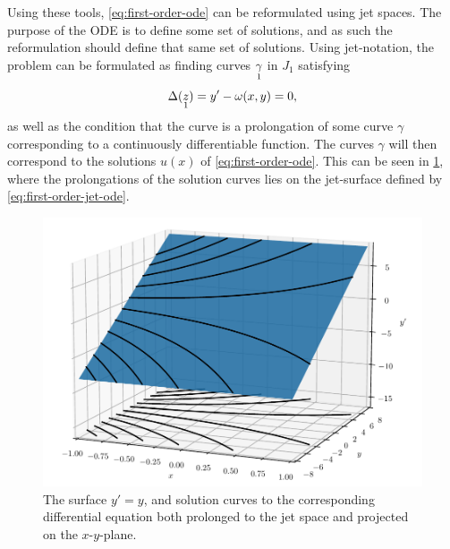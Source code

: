 Using these tools, \cref{eq:first-order-ode} can be reformulated using jet spaces.
The purpose of the ODE is to define some set of solutions, and as such the reformulation should define that same set of solutions.
Using jet-notation, the problem can be formulated as finding curves \(\prolong{\gamma}{1}\) in \(J_1\) satisfying
\begin{equation} \label{eq:first-order-jet-ode}
  \Delta(\prolong{z}{1}) = y' - \omega(x,y) = 0,
\end{equation}
as well as the condition that the curve is a prolongation of some curve \(\gamma\) corresponding to a continuously differentiable function.
The curves \(\gamma\) will then correspond to the solutions \(u(x)\) of \cref{eq:first-order-ode}.
This can be seen in \cref{fig:jet-surface}, where the prolongations of the solution curves lies on the jet-surface defined by \cref{eq:first-order-jet-ode}.
\begin{figure}
  \centering
  \includegraphics[width=.95\textwidth]{images/jet-surface}
  \caption{The surface \(y' = y\), and solution curves to the corresponding differential equation both prolonged to the jet space and projected on the \(x\)-\(y\)-plane.}
  \label{fig:jet-surface}
\end{figure}

